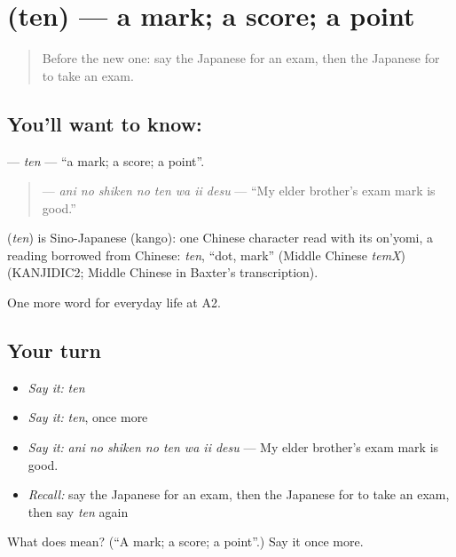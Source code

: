 \section[\texorpdfstring{\ja{てん} (ten)}{てん (ten)}]{ (ten) — a mark; a score; a point}

\label{lesson:JA-C226-ten}



\begin{quote}
Before the new one: say the Japanese for an exam, then the Japanese for to take an exam.
\end{quote}

\subsection*{You'll want to know: }
\textbf{} — \emph{ten} — \textquotedblleft{}a mark; a score; a point\textquotedblright{}.

\begin{quote}
\textbf{   } — \emph{ani no shiken no ten wa ii desu} — \textquotedblleft{}My elder brother's exam mark is good.\textquotedblright{}
\end{quote}

\begin{cousinweb}
\textbf{} (\emph{ten}) is Sino-Japanese (kango): one Chinese character read with its on'yomi, a reading borrowed from Chinese: \emph{ten}, \textquotedblleft{}dot, mark\textquotedblright{} (Middle Chinese \emph{temX}) (KANJIDIC2; Middle Chinese in Baxter's transcription).
\end{cousinweb}

\begin{grammarlens}[title={What you've built}]
One more word for everyday life at A2.
\end{grammarlens}

\subsection*{Your turn}
\begin{itemize}
\raggedright
  \item \emph{Say it:} \emph{ten}
  \item \emph{Say it:} \emph{ten}, once more
  \item \emph{Say it:} \emph{ani no shiken no ten wa ii desu} — My elder brother's exam mark is good.
  \item \emph{Recall:} say the Japanese for an exam, then the Japanese for to take an exam, then say \emph{ten} again
\end{itemize}

\begin{tcolorbox}[breakable,colback=teal!4,colframe=teal!35!black,title={Before you move on}]
What does  mean? (\textquotedblleft{}A mark; a score; a point\textquotedblright{}.) Say it once more.
\end{tcolorbox}
